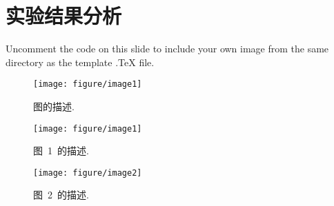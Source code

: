 \section{实验结果分析}
\zhlipsum[3]

Uncomment the code on this slide to include your own image from the same directory as the template .TeX file.
\begin{figure}[htp!]
	\centering
	\texttt{[image: figure/image1]}
	\caption{图的描述.} \label{fig:A}
\end{figure}


\begin{figure}[htb]
	\centering
	\begin{minipage}{0.48\linewidth}
		\centering
		\texttt{[image: figure/image1]}
		\caption{图~1~的描述.}
	\end{minipage}\hfill
	\begin{minipage}{0.48\linewidth}
		\centering
		\texttt{[image: figure/image2]}
		\caption{图~2~的描述.}
	\end{minipage}
\end{figure}